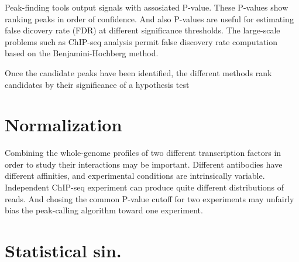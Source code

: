 

Peak-finding tools output signals with assosiated P-value.
These P-values show ranking peaks in order of confidence.
And also P-values are useful for estimating false dicovery rate (FDR) at different significance thresholds.
% 
The large-scale problems such as ChIP-seq analysis permit false discovery rate computation based on the Benjamini-Hochberg method.



Once the candidate peaks have been identified, the different methods rank candidates by their significance of a hypothesis test

\section{Normalization}
Combining the whole-genome profiles of two different transcription factors in order to study their interactions may be important.
Different antibodies have different affinities, and experimental conditions are intrinsically variable.
Independent ChIP-seq experiment can produce quite different distributions of reads.
And chosing the common P-value cutoff for two experiments may unfairly bias the peak-calling algorithm toward one experiment.


\section{Statistical sin.}